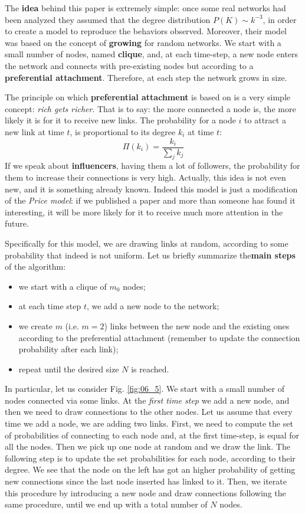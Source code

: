 \documentclass[../main/main.tex]{subfiles}
\begin{document}
The \textbf{idea} behind this paper is extremely simple: once some real networks had been analyzed they assumed that the degree distribution \( P(K) \sim k^{-3} \), in order to create a model to reproduce the behaviors observed.
Moreover, their model was based on the concept of \textbf{growing} for random networks. We start with a small number of nodes, named \textbf{clique}, and, at each time-step, a new node enters the network and connects with pre-existing nodes but according to a \textbf{preferential attachment}. Therefore, at each step the network grows in size.

The principle on which \textbf{preferential attachment} is based on is a very simple concept: \textit{rich gets richer}. That is to say: the more connected a node is, the more likely it is for it to receive new links. The probability for a node $i$ to attract a new link at time $t$, is proportional to its degree $k_i$ at time $t$:
\begin{equation}
  \Pi (k_i) = \frac{k_i}{\sum_{j}^{} k_j }
\end{equation}
If we speak about \textbf{influencers}, having them a lot of followers, the probability for them to increase their connections is very high. Actually, this idea is not even new, and it is something already known. Indeed this model is just a modification of the \textit{Price model}: if we published a paper and more than someone has found it interesting, it will be more likely for it to receive much more attention in the future.

Specifically for this model, we are drawing links at random, according to some probability that indeed is not uniform. Let us briefly summarize the\textbf{main steps} of the algorithm:
\begin{itemize}
\item we start with a clique of \( m_0 \) nodes;
\item at each time step \( t \), we add a new node to the network;
\item we create $m$ (i.e. $m=2$) links between the new node and the existing ones according to the preferential attachment (remember to update the connection probability after each link);
\item repeat until the desired size $N$ is reached.
\end{itemize}
In particular, let us consider Fig. \ref{fig:06_5}. We start with a small number of nodes connected via some links. At the \textit{first time step} we add a new node, and then we need to draw connections to the other nodes. Let us assume that every time we add a node, we are adding two links. First, we need to compute the set of probabilities of connecting to each node and, at the first time-step, is equal for all the nodes. Then we pick up one node at random and we draw the link. The following step is to update the set probabilities for each node, according to their degree. We see that the node on the left has got an higher probability of getting new connections since the last node inserted has linked to it. Then, we iterate this procedure by introducing a new node and draw connections following the same procedure, until we end up with a total number of \( N \) nodes.
\end{document}
